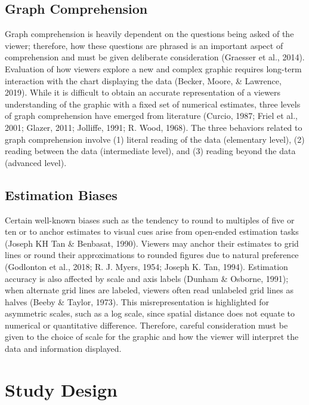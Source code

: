 \documentclass[print]{nuthesis}
\begin{document}
\hypertarget{graph-comprehension-1}{%
\subsection{Graph Comprehension}\label{graph-comprehension-1}}

Graph comprehension is heavily dependent on the questions being asked of the viewer; therefore, how these questions are phrased is an important aspect of comprehension and must be given deliberate consideration (Graesser et al., 2014).
Evaluation of how viewers explore a new and complex graphic requires long-term interaction with the chart displaying the data (Becker, Moore, \& Lawrence, 2019).
While it is difficult to obtain an accurate representation of a viewers understanding of the graphic with a fixed set of numerical estimates, three levels of graph comprehension have emerged from literature (Curcio, 1987; Friel et al., 2001; Glazer, 2011; Jolliffe, 1991; R. Wood, 1968).
The three behaviors related to graph comprehension involve (1) literal reading of the data (elementary level), (2) reading between the data (intermediate level), and (3) reading beyond the data (advanced level).

\hypertarget{estimation-biases-1}{%
\subsection{Estimation Biases}\label{estimation-biases-1}}

Certain well-known biases such as the tendency to round to multiples of five or ten or to anchor estimates to visual cues arise from open-ended estimation tasks (Joseph KH Tan \& Benbasat, 1990).
Viewers may anchor their estimates to grid lines or round their approximations to rounded figures due to natural preference (Godlonton et al., 2018; R. J. Myers, 1954; Joseph K. Tan, 1994).
Estimation accuracy is also affected by scale and axis labels (Dunham \& Osborne, 1991); when alternate grid lines are labeled, viewers often read unlabeled grid lines as halves (Beeby \& Taylor, 1973).
This misrepresentation is highlighted for asymmetric scales, such as a log scale, since spatial distance does not equate to numerical or quantitative difference.
Therefore, careful consideration must be given to the choice of scale for the graphic and how the viewer will interpret the data and information displayed.

\hypertarget{study-design-2}{%
\section{Study Design}\label{study-design-2}}
\end{document}
